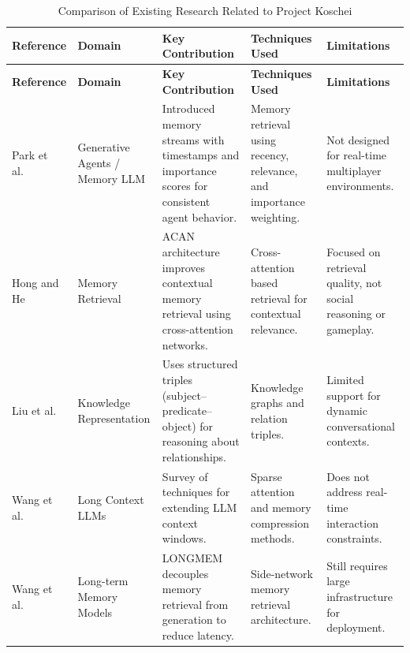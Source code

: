 {\small
\renewcommand{\arraystretch}{0.85}

\begin{longtable}{|p{2.3cm}|p{2.3cm}|p{3.5cm}|p{3.3cm}|p{2.8cm}|}

\caption{Comparison of Existing Research Related to Project Koschei} \\

\hline
\textbf{Reference} & \textbf{Domain} & \textbf{Key Contribution} & \textbf{Techniques Used} & \textbf{Limitations} \\
\hline
\endfirsthead

\hline
\textbf{Reference} & \textbf{Domain} & \textbf{Key Contribution} & \textbf{Techniques Used} & \textbf{Limitations} \\
\hline
\endhead

\hline
\endfoot

\hline
\endlastfoot

Park et al.~\cite{park2023generative} &
Generative Agents / Memory LLM &
Introduced memory streams with timestamps and importance scores for consistent agent behavior. &
Memory retrieval using recency, relevance, and importance weighting. &
Not designed for real-time multiplayer environments. \\ \hline

Hong and He~\cite{hong2025} &
Memory Retrieval &
ACAN architecture improves contextual memory retrieval using cross-attention networks. &
Cross-attention based retrieval for contextual relevance. &
Focused on retrieval quality, not social reasoning or gameplay. \\ \hline

Liu et al.~\cite{liu2022} &
Knowledge Representation &
Uses structured triples (subject–predicate–object) for reasoning about relationships. &
Knowledge graphs and relation triples. &
Limited support for dynamic conversational contexts. \\ \hline

Wang et al.~\cite{wangy2024} &
Long Context LLMs &
Survey of techniques for extending LLM context windows. &
Sparse attention and memory compression methods. &
Does not address real-time interaction constraints. \\ \hline

Wang et al.~\cite{wangw2024} &
Long-term Memory Models &
LONGMEM decouples memory retrieval from generation to reduce latency. &
Side-network memory retrieval architecture. &
Still requires large infrastructure for deployment. \\ \hline


\end{longtable}}
